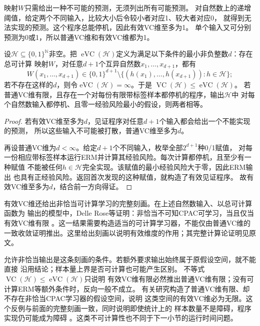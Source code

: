 映射$W$只需给出一种不可能的预测，无须列出所有可能预测。
对自然数上的递增阈值，给定两个不同输入，比较大小后令较小者对应1、较大者对应0，
就得到无法实现的预测。这个程序总能停机，因此有效VC维至多为1。
单个输入又可分别预测为0或1，所以普通VC维和有效VC维都为1。

\begin{theorem}[普通VC维与有效VC维的比较]
\label{thm:effective-vc-comparison}
设$\mathcal H\subseteq\{0,1\}^{\mathbb N}$非空。把
$\operatorname{eVC}(\mathcal H)$定义为满足以下条件的最小非负整数$d$：存在总可计算
映射$W$，对任意$d+1$个互异自然数$x_1,\ldots,x_{d+1}$，都有
\[
 W(x_1,\ldots,x_{d+1})\in\{0,1\}^{d+1}
 \setminus\{(h(x_1),\ldots,h(x_{d+1})):h\in\mathcal H\};
\]
若不存在这样的$d$，则令$\operatorname{eVC}(\mathcal H)=\infty$。于是
$\operatorname{VC}(\mathcal H)\leq\operatorname{eVC}(\mathcal H)$。
若普通VC维有限，且存在一个对每份有限带标签样本都停机的程序，输出$\mathcal H$中
对每个自然数输入都停机、且零一经验风险最小的假设，则两者相等。
\end{theorem}

\begin{proof}
若有效VC维至多为$d$，见证程序对任意$d+1$个输入都会给出一个不能实现的预测，
所以这些输入不可能被打散，普通VC维至多为$d$。

再设普通VC维为$d<\infty$。给定$d+1$个不同输入，枚举全部$2^{d+1}$种0/1赋值，
对每一份相应带标签样本运行ERM并计算其经验风险。每次计算都停机，且至少有一种赋值
不能被任何$h\in\mathcal H$完全实现。该赋值的最小经验风险大于零，因此ERM输出
也具有正经验风险。返回首次发现的这种赋值，就构造了有效见证程序。
故有效VC维至多为$d$，结合前一方向得证。
\end{proof}

有效VC维还给出非恰当可计算学习的完整刻画。在上述自然数输入、以总可计算函数为
输出的模型中，Delle Rose等证明：非恰当不可知CPAC可学习，当且仅当有效VC维有限
。这一结果需要构造适当的可计算学习器，不能仅由普通VC维的
一致收敛证明推出。这里给出刻画以说明有效维度的作用；其完整计算论证明见原文。

允许非恰当输出是这条刻画的条件。若额外要求输出始终属于原假设空间，就不能直接
沿用结论；样本量上界是否可计算也可能产生区别。
不等式$\operatorname{VC}(\mathcal H)\leq\operatorname{eVC}(\mathcal H)$只说明
有效VC维有限必然推出普通VC维有限；没有可计算ERM等额外条件时，反向一般不成立。
有关研究构造了普通VC维有限、却不存在非恰当CPAC学习器的假设空间，说明
这类空间的有效VC维必为无限。这个反例与前面的完整刻画一致，同时说明即使统计上的
样本数量不是障碍，程序实现仍可能成为障碍
。这类不可计算性也不同于下一小节的运行时间问题。

